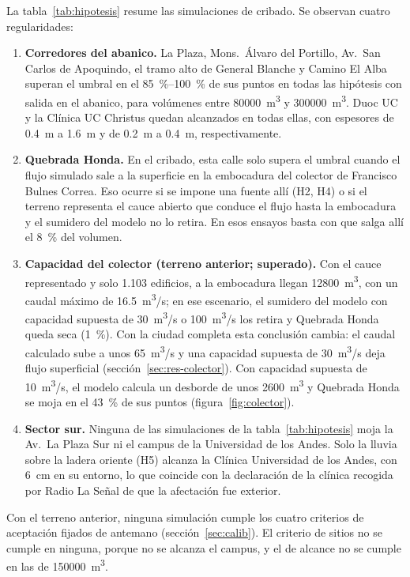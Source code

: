 La tabla~\ref{tab:hipotesis} resume las simulaciones de cribado. Se observan cuatro regularidades:
\begin{enumerate}
\item \textbf{Corredores del abanico.} La Plaza, Mons.\ Álvaro del Portillo, Av.\ San Carlos de Apoquindo, el tramo alto de General Blanche y Camino El Alba superan el umbral en el \SIrange{85}{100}{\percent} de sus puntos en todas las hipótesis con salida en el abanico, para volúmenes entre \SI{80000}{m^3} y \SI{300000}{m^3}. Duoc UC y la Clínica UC Christus quedan alcanzados en todas ellas, con espesores de \SI{0,4}{m} a \SI{1,6}{m} y de \SI{0,2}{m} a \SI{0,4}{m}, respectivamente.
\item \textbf{Quebrada Honda.} En el cribado, esta calle solo supera el umbral cuando el flujo simulado sale a la superficie en la embocadura del colector de Francisco Bulnes Correa. Eso ocurre si se impone una fuente allí (H2, H4) o si el terreno representa el cauce abierto que conduce el flujo hasta la embocadura y el sumidero del modelo no lo retira. En esos ensayos basta con que salga allí el \SI{8}{\percent} del volumen.
\item \textbf{Capacidad del colector (terreno anterior; superado).} Con el cauce representado y solo 1.103 edificios, a la embocadura llegan \SI{12800}{m^3}, con un caudal máximo de \SI{16,5}{m^3/s}; en ese escenario, el sumidero del modelo con capacidad supuesta de \SI{30}{m^3/s} o \SI{100}{m^3/s} los retira y Quebrada Honda queda seca (\SI{1}{\percent}). Con la ciudad completa esta conclusión cambia: el caudal calculado sube a unos \SI{65}{m^3/s} y una capacidad supuesta de \SI{30}{m^3/s} deja flujo superficial (sección~\ref{sec:res-colector}). Con capacidad supuesta de \SI{10}{m^3/s}, el modelo calcula un desborde de unos \SI{2600}{m^3} y Quebrada Honda se moja en el \SI{43}{\percent} de sus puntos (figura~\ref{fig:colector}).
\item \textbf{Sector sur.} Ninguna de las simulaciones de la tabla~\ref{tab:hipotesis} moja la Av.\ La Plaza Sur ni el campus de la Universidad de los Andes. Solo la lluvia sobre la ladera oriente (H5) alcanza la Clínica Universidad de los Andes, con \SI{6}{cm} en su entorno, lo que coincide con la declaración de la clínica recogida por Radio La Señal de que la afectación fue exterior.
\end{enumerate}
Con el terreno anterior, ninguna simulación cumple los cuatro criterios de aceptación fijados de antemano (sección~\ref{sec:calib}). El criterio de sitios no se cumple en ninguna, porque no se alcanza el campus, y el de alcance no se cumple en las de \SI{150000}{m^3}.

